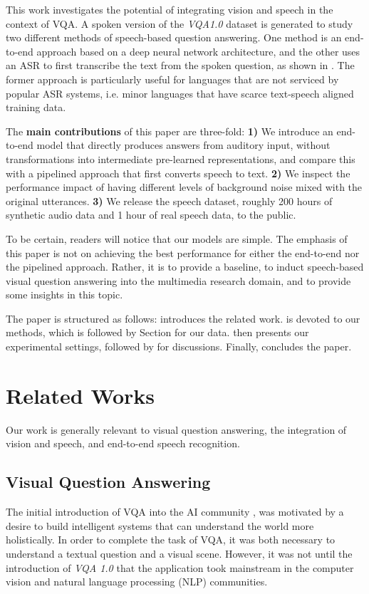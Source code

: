 \documentclass[letterpaper]{article} %
\begin{document}
This work investigates the potential of integrating vision and speech in the context of VQA. A spoken version of the \textit{VQA1.0} dataset is generated to study two different methods of speech-based question answering. One method is an end-to-end approach based on a deep neural network architecture, and the other uses an ASR to first transcribe the text from the spoken question, as shown in . The former approach is particularly useful for languages that are not serviced by popular ASR systems, i.e. minor languages that have scarce text-speech aligned training data.

The \textbf{main contributions} of this paper are three-fold: \textbf{1)} We introduce an end-to-end model that directly produces answers from auditory input, without transformations into intermediate pre-learned representations, and compare this with a pipelined approach that first converts speech to text. \textbf{2)} We inspect the performance impact of having different levels of background noise mixed with the original utterances. \textbf{3)} We release the speech dataset, roughly 200 hours of synthetic audio data and 1 hour of real speech data, to the public.

To be certain, readers will notice that our models are simple. The emphasis of this paper is not on achieving the best performance for either the end-to-end nor the pipelined approach. Rather, it is to provide a baseline, to induct speech-based visual question answering into the multimedia research domain, and to provide some insights in this topic.

The paper is structured as follows:  introduces the related work.  is devoted to our methods, which is followed by Section  for our data.  then presents our experimental settings, followed by  for discussions. Finally,  concludes the paper.   

\section{Related Works}
\label{sec:related}
Our work is generally relevant to visual question answering, the integration of vision and speech, and end-to-end speech recognition.

\subsection{Visual Question Answering}
The initial introduction of VQA into the AI community \cite{realtime:vqa}, \cite{daquar} was motivated by a desire to build intelligent systems that can understand the world more holistically. In order to complete the task of VQA, it was both necessary to understand a textual question and a visual scene. However, it was not until the introduction of \textit{VQA 1.0} \cite{VQA} that the application took mainstream in the computer vision and natural language processing (NLP) communities.
\end{document}
